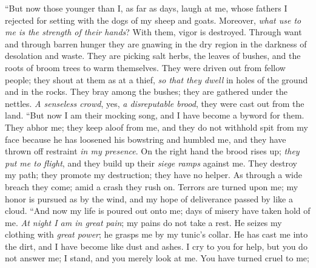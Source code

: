 \begin{biblechapter} %
 “But now those younger than I, as far as days, laugh at me, 
whose fathers I rejected for setting with the dogs of my sheep and goats.
\verse Moreover, \textit{what use to me is the strength of their hands}? 
With them, vigor is destroyed.
\verse Through want and through barren hunger 
they are gnawing in the dry region in the darkness of desolation and waste.
\verse They are picking salt herbs, the leaves of bushes, 
and the roots of broom trees to warm themselves.
\verse They were driven out from fellow people; 
they shout at them as at a thief,
\verse \textit{so that they dwell} 
in holes of the ground and in the rocks.
\verse They bray among the bushes; 
they are gathered under the nettles.
\verse \textit{A senseless crowd}, yes, \textit{a disreputable brood}, 
they were cast out from the land.
\verse “But now I am their mocking song, 
and I have become a byword for them.
\verse They abhor me; they keep aloof from me, 
and they do not withhold spit from my face
\verse because he has loosened his bowstring and humbled me, 
and they have thrown off restraint \textit{in my presence}.
\verse On the right hand the brood rises up; 
\textit{they put me to flight}, 
and they build up their \textit{siege ramps} against me.
\verse They destroy my path; 
they promote my destruction; 
they have no helper.
\verse As through a wide breach they come; 
amid a crash they rush on.
\verse Terrors are turned upon me; 
my honor is pursued as by the wind, 
and my hope of deliverance passed by like a cloud.
\verse “And now my life is poured out onto me; 
days of misery have taken hold of me.
\verse \textit{At night I am in great pain}; 
my pains do not take a rest.
\verse He seizes my clothing with \textit{great power}; 
he grasps me by my tunic’s collar.
\verse He has cast me into the dirt, 
and I have become like dust and ashes.
\verse I cry to you for help, but you do not answer me; 
I stand, and you merely look at me.
\verse You have turned cruel to me; 

\end{biblechapter}
